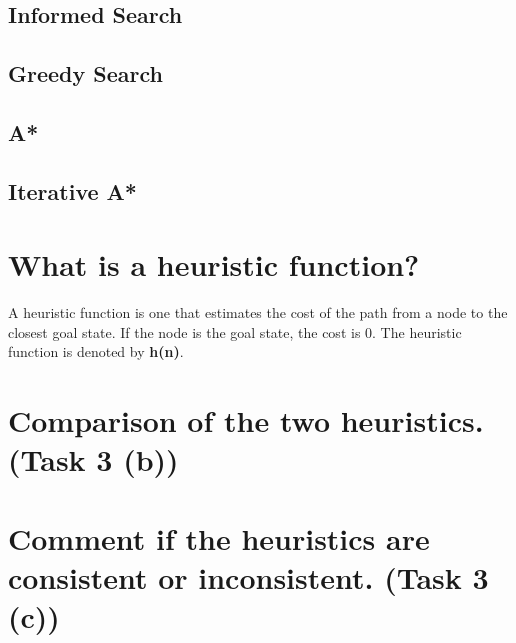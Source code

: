 \documentclass[11pt]{article}
\begin{document}
\subsection{Informed Search}

\subsection{Greedy Search}

\subsection{A*}

\subsection{Iterative A*}

\newpage
\section{What is a heuristic function?}
A heuristic function is one that estimates the cost of the path from a node to the closest goal state. If the node is the goal state, the cost is 0. The heuristic function is denoted by \textbf{h(n)}.

\newpage
\section{Comparison of the two heuristics. (Task 3 (b))}

\newpage
\section{Comment if the heuristics are consistent or inconsistent. (Task 3 (c))}
\end{document}
